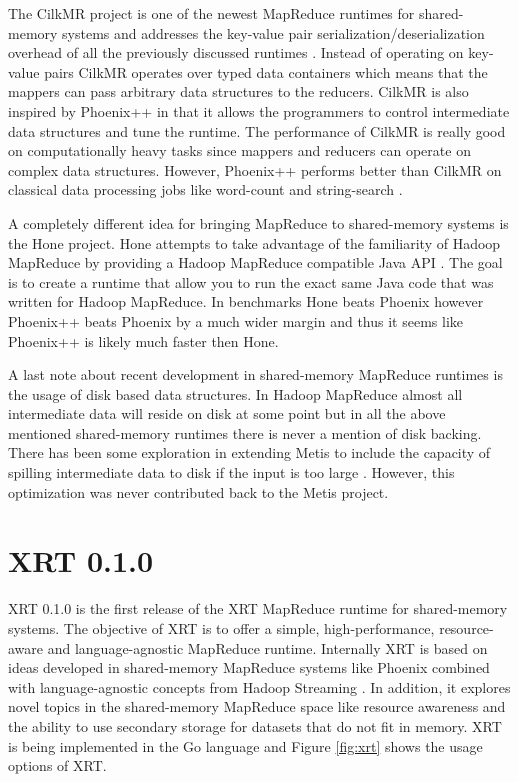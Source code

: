 \documentclass[twocolumn,11px]{article}       %
\begin{document}
The CilkMR project is one of the newest MapReduce runtimes for shared-memory
systems and addresses the key-value pair serialization/deserialization overhead
of all the previously discussed runtimes \cite{CilkMR}. Instead of operating on
key-value pairs CilkMR operates over typed data containers which means that the
mappers can pass arbitrary data structures to the reducers. CilkMR is also
inspired by Phoenix++ in that it allows the programmers to control intermediate
data structures and tune the runtime. The performance of CilkMR is really good
on computationally heavy tasks since mappers and reducers can operate on complex
data structures. However, Phoenix++ performs better than CilkMR on classical
data processing jobs like word-count and string-search \cite{CilkMR} \cite{GoogleMapReduce}.

A completely different idea for bringing MapReduce to shared-memory systems is
the Hone project. Hone attempts to take advantage of the familiarity of Hadoop
MapReduce by providing a Hadoop MapReduce compatible Java API
\cite{ScalingDown}. The goal is to create a runtime that allow you to run the
exact same Java code that was written for Hadoop MapReduce. In benchmarks Hone
beats Phoenix however Phoenix++ beats Phoenix by a much wider margin and thus it
seems like Phoenix++ is likely much faster then Hone.

A last note about recent development in shared-memory MapReduce runtimes is the
usage of disk based data structures. In Hadoop MapReduce almost all intermediate
data will reside on disk at some point but in all the above mentioned
shared-memory runtimes there is never a mention of disk backing. There has been
some exploration in extending Metis to include the capacity of spilling
intermediate data to disk if the input is too large \cite{DiskOptimization}.
However, this optimization was never contributed back to the Metis project.

\section{XRT 0.1.0} \label{sec:xrt}

XRT 0.1.0 is the first release of the XRT MapReduce runtime for shared-memory systems.
The objective of XRT is to offer a simple, high-performance, resource-aware and language-agnostic MapReduce runtime.
Internally XRT is based on ideas developed in shared-memory MapReduce systems like Phoenix \cite{Phoenix} combined with language-agnostic concepts from Hadoop Streaming \cite{HadoopStreaming}.
In addition, it explores novel topics in the shared-memory MapReduce space like resource awareness and the ability to use secondary storage for datasets that do not fit in memory.
XRT is being implemented in the Go language and Figure \ref{fig:xrt} shows the usage options of XRT.
\end{document}
